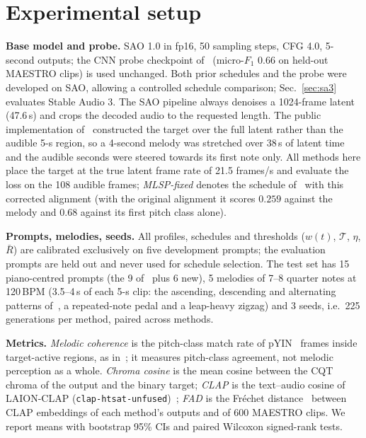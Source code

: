 \documentclass{article}
\begin{document}
\section{Experimental setup}
\label{sec:setup}
\textbf{Base model and probe.} SAO 1.0 in fp16, 50 sampling steps, CFG 4.0, 5-second outputs; the CNN probe checkpoint of~\cite{ye2026pitchclass} (micro-$F_1$ 0.66 on held-out MAESTRO clips) is used unchanged. Both prior schedules and the probe were developed on SAO, allowing a controlled schedule comparison; Sec.~\ref{sec:sa3} evaluates Stable Audio 3. The SAO pipeline always denoises a 1024-frame latent (47.6\,s) and crops the decoded audio to the requested length. The public implementation of~\cite{ye2026pitchclass} constructed the target over the full latent rather than the audible 5-s region, so a 4-second melody was stretched over 38\,s of latent time and the audible seconds were steered towards its first note only. All methods here place the target at the true latent frame rate of 21.5 frames/s and evaluate the loss on the 108 audible frames; \emph{MLSP-fixed} denotes the schedule of~\cite{ye2026pitchclass} with this corrected alignment (with the original alignment it scores $0.259$ against the melody and $0.68$ against its first pitch class alone).

\textbf{Prompts, melodies, seeds.} All profiles, schedules and thresholds ($w(t)$, $\mathcal{T}$, $\eta$, $\bar R$) are calibrated exclusively on five development prompts; the evaluation prompts are held out and never used for schedule selection. The test set has 15 piano-centred prompts (the 9 of~\cite{ye2026pitchclass} plus 6 new), 5 melodies of 7--8 quarter notes at 120\,BPM (3.5--4\,s of each 5-s clip: the ascending, descending and alternating patterns of~\cite{ye2026pitchclass}, a repeated-note pedal and a leap-heavy zigzag) and 3 seeds, i.e.\ 225 generations per method, paired across methods.

\textbf{Metrics.} \emph{Melodic coherence} is the pitch-class match rate of pYIN~\cite{mauch2014pyin} frames inside target-active regions, as in~\cite{ye2026pitchclass}; it measures pitch-class agreement, not melodic perception as a whole. \emph{Chroma cosine} is the mean cosine between the CQT chroma of the output and the binary target; \emph{CLAP} is the text--audio cosine of LAION-CLAP (\texttt{clap-htsat-unfused})~\cite{wu2023clap}; \emph{FAD} is the Fr\'echet distance~\cite{kilgour2019fad} between CLAP embeddings of each method's outputs and of 600 MAESTRO clips. We report means with bootstrap 95\% CIs and paired Wilcoxon signed-rank tests.
\end{document}
